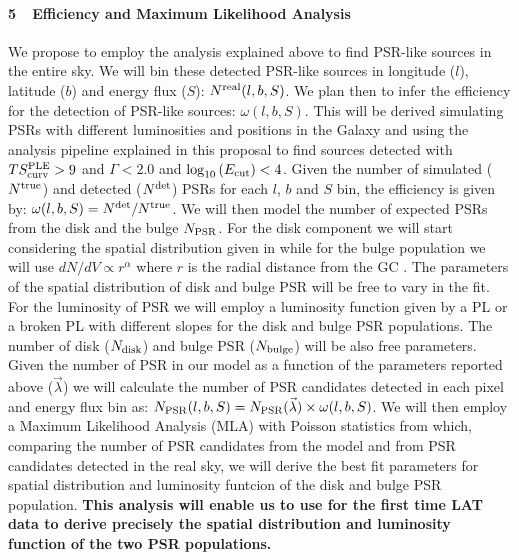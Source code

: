 \documentclass[12pt,twoside,letterpaper,onecolumn,english]{article}
\begin{document}
\paragraph{5\ \ Efficiency and Maximum Likelihood Analysis}
We propose to employ the analysis explained above to find PSR-like sources in the entire sky. 
We will bin these detected PSR-like sources in longitude ($l$), latitude ($b$) and energy flux ($S$): $N^{\rm{real}}(l,b,S)$.
We plan then to infer the efficiency for the detection of PSR-like sources: $\omega(l,b,S)$. This will be derived simulating PSRs with different luminosities and positions in the Galaxy and using the analysis pipeline explained in this proposal to find sources detected with $TS^{\rm{PLE}}_{\rm{curv}}>9$ and $\Gamma<2.0$ and $\log_{10}{(E_{\rm{cut}})}<4$. Given the number of simulated ($N^{\rm{true}}$) and detected ($N^{\rm{det}}$) PSRs for each $l$, $b$ and $S$ bin, the efficiency is given by: $\omega(l,b,S)=N^{\rm{det}}/N^{\rm{true}}$.
We will then model the number of expected PSRs from the disk and the bulge $N_{\rm{PSR}}$. For the disk component we will start considering the spatial distribution given in \cite{2004IAUS..218..105L} while for the bulge population we will use $dN/dV\propto r^{\alpha}$ where $r$ is the radial distance from the GC \cite{Calore:2014xka}. 
The parameters of the spatial distribution of disk and bulge PSR will be free to vary in the fit.
For the luminosity of PSR we will employ a luminosity function given by a PL or a broken PL with different slopes for the disk and bulge PSR populations. 
The number of disk ($N_{\rm{disk}}$) and bulge PSR ($N_{\rm{bulge}}$) will be also free parameters. 
Given the number of PSR in our model as a function of the parameters reported above ($\vec{\lambda}$) we will calculate the number of PSR candidates detected in each pixel and energy flux bin as: $N_{\rm{PSR}}(l,b,S)=N_{\rm{PSR}}(\vec{\lambda})\times \omega(l,b,S)$. We will then employ a Maximum Likelihood Analysis (MLA) with Poisson statistics from which, comparing the number of PSR candidates from the model and from PSR candidates detected in the real sky, we will derive the best fit parameters for spatial distribution and luminosity funtcion of the disk and bulge PSR population.
{\bf This analysis will enable us to use for the first time LAT data to derive precisely the spatial distribution and luminosity function of the two PSR populations.}
\end{document}
